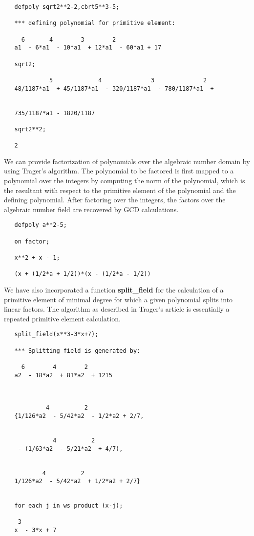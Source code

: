 \example{}

\begin{verbatim}
   defpoly sqrt2**2-2,cbrt5**3-5;

   *** defining polynomial for primitive element:

     6       4        3        2
   a1  - 6*a1  - 10*a1  + 12*a1  - 60*a1 + 17

   sqrt2;

             5             4              3              2
   48/1187*a1  + 45/1187*a1  - 320/1187*a1  - 780/1187*a1  +


   735/1187*a1 - 1820/1187

   sqrt2**2;

   2
\end{verbatim}
\newpage
We can provide factorization of polynomials over the algebraic number
domain by using Trager's algorithm.  The polynomial to be factored is first
mapped to a polynomial over the integers by computing the norm of the
polynomial, which is the resultant with respect to the primitive element of
the polynomial and the defining polynomial.  After factoring over the
integers, the factors over the algebraic number field are recovered by GCD
calculations.

\example{}

\begin{verbatim}
   defpoly a**2-5;

   on factor;

   x**2 + x - 1;

   (x + (1/2*a + 1/2))*(x - (1/2*a - 1/2))
\end{verbatim}
We have also incorporated a function {\bf split\_field} for the calculation
of a primitive element of minimal degree for which a given polynomial splits
into linear factors.  The algorithm as described in Trager's article is
essentially a repeated primitive element calculation.

\example{}

\begin{verbatim}
   split_field(x**3-3*x+7);

   *** Splitting field is generated by:

     6        4        2
   a2  - 18*a2  + 81*a2  + 1215



            4          2
   {1/126*a2  - 5/42*a2  - 1/2*a2 + 2/7,


              4          2
    - (1/63*a2  - 5/21*a2  + 4/7),


           4          2
   1/126*a2  - 5/42*a2  + 1/2*a2 + 2/7}


   for each j in ws product (x-j);

    3
   x  - 3*x + 7
\end{verbatim}

